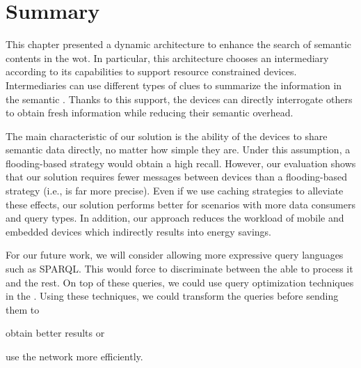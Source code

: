 \section{Summary}
\label{sec:search_summary}

This chapter presented a dynamic architecture to enhance the search of semantic contents in the \acl{wot}.
In particular, this architecture chooses an intermediary according to its capabilities to support resource constrained devices.
Intermediaries can use different types of clues to summarize the information in the semantic \Space{}.
Thanks to this support, the devices can directly interrogate others to obtain fresh information while reducing their semantic overhead.

The main characteristic of our solution is the ability of the devices to share semantic data directly, no matter how simple they are. %
Under this assumption, a flooding-based strategy would obtain a high recall. %
However, our evaluation shows that our solution requires fewer messages between devices than a flooding-based strategy (i.e., is far more precise).
Even if we use caching strategies to alleviate these effects, our solution performs better for scenarios with more data consumers and query types.
In addition, our approach reduces the workload of mobile and embedded devices which indirectly results into energy savings.

For our future work, we will consider allowing more expressive query languages such as SPARQL. %
This would force \consumers{} to discriminate between the \providers{} able to process it and the rest.
On top of these queries, we could use query optimization techniques in the \consumers{} \citep{schwarte_fedx_optimization_2011}.
Using these techniques, we could transform the queries before sending them to
\begin{enumerate*}[label=\itshape(\alph*\upshape)]
  \item obtain better results or
  \item use the network more efficiently.
\end{enumerate*}